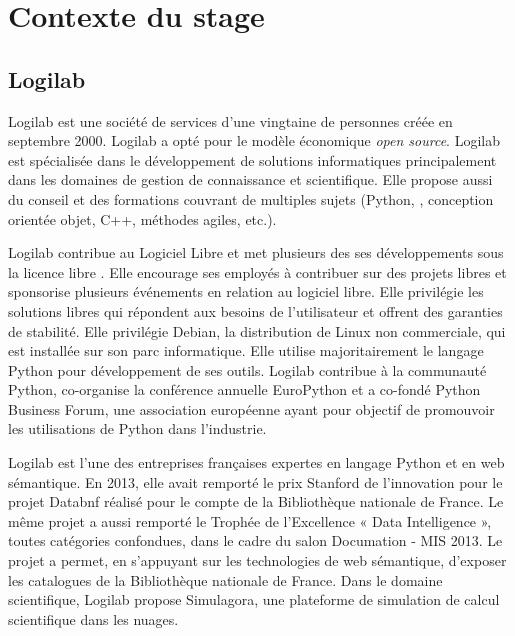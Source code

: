 
\chapter{Contexte du stage}
\section{Logilab}
Logilab est une société de services d'une vingtaine de personnes créée en septembre 2000. Logilab a opté pour le modèle économique \textit{open source}. Logilab est spécialisée dans le développement de solutions informatiques principalement dans les domaines de gestion de connaissance et scientifique. Elle propose aussi du conseil et des formations couvrant de multiples sujets (Python, , conception orientée objet, C++, méthodes agiles, etc.).

Logilab contribue au Logiciel Libre et met plusieurs des ses développements sous la licence libre . Elle encourage ses employés à contribuer sur des projets libres et sponsorise plusieurs événements en relation au logiciel libre. Elle privilégie les solutions libres qui répondent aux besoins de l'utilisateur et offrent des garanties de stabilité. Elle privilégie Debian, la distribution de Linux non commerciale, qui est installée sur son parc informatique. Elle utilise majoritairement le langage Python pour développement de ses outils. Logilab contribue à la communauté Python, co-organise la conférence annuelle EuroPython et a co-fondé Python Business Forum, une association européenne ayant pour objectif de promouvoir les utilisations de Python dans l'industrie.

Logilab est l'une des entreprises françaises expertes en langage Python et en web sémantique. En 2013, elle avait remporté le prix Stanford de l'innovation pour le projet Databnf réalisé pour le compte de la Bibliothèque nationale de France. Le même projet a aussi remporté le Trophée de l'Excellence « Data Intelligence », toutes catégories confondues, dans le cadre du salon Documation - MIS 2013\cite{dta}. Le projet a permet, en s’appuyant sur les technologies de web sémantique, d'exposer les catalogues de la Bibliothèque nationale de France. Dans le domaine scientifique, Logilab propose Simulagora, une plateforme de simulation de calcul scientifique dans les nuages.


